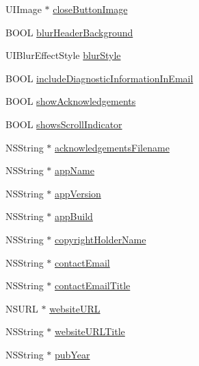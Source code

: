 \begin{DoxyCompactItemize}
\item 
U\+I\+Image $\ast$ \hyperlink{interface_r_f_about_view_controller_a4c900f72531fa3ec5ca7d2db38d3fed8}{close\+Button\+Image}
\item 
B\+O\+O\+L \hyperlink{interface_r_f_about_view_controller_a00f6a4a8433aa3571b40529ae8daf3bf}{blur\+Header\+Background}
\item 
U\+I\+Blur\+Effect\+Style \hyperlink{interface_r_f_about_view_controller_a6dc25664d6ce6038b0d3b3e89641f945}{blur\+Style}
\item 
B\+O\+O\+L \hyperlink{interface_r_f_about_view_controller_a8d3b2217c6804e41c54bb1592069c3b2}{include\+Diagnostic\+Information\+In\+Email}
\item 
B\+O\+O\+L \hyperlink{interface_r_f_about_view_controller_aec7d35dbeb254a3cc1775e9d18809fb7}{show\+Acknowledgements}
\item 
B\+O\+O\+L \hyperlink{interface_r_f_about_view_controller_a84a5073683af56bf6023d46b63f45ef5}{shows\+Scroll\+Indicator}
\item 
N\+S\+String $\ast$ \hyperlink{interface_r_f_about_view_controller_a2813930accc06d10587c6a46f17e9682}{acknowledgements\+Filename}
\item 
N\+S\+String $\ast$ \hyperlink{interface_r_f_about_view_controller_abe9bbad453dbb7512cbb31f70e8306f4}{app\+Name}
\item 
N\+S\+String $\ast$ \hyperlink{interface_r_f_about_view_controller_ab2f19b0299165e723a02dd2d0bb1b987}{app\+Version}
\item 
N\+S\+String $\ast$ \hyperlink{interface_r_f_about_view_controller_ab5c2e854a7b49b2a69eb7fa4ad83c687}{app\+Build}
\item 
N\+S\+String $\ast$ \hyperlink{interface_r_f_about_view_controller_af0339e5ce8d105d3f50a48fb590a4cb4}{copyright\+Holder\+Name}
\item 
N\+S\+String $\ast$ \hyperlink{interface_r_f_about_view_controller_aed44f1f83aaf939e3c3100bc6551a97b}{contact\+Email}
\item 
N\+S\+String $\ast$ \hyperlink{interface_r_f_about_view_controller_acf9487e02af3ead791110b40d6917a80}{contact\+Email\+Title}
\item 
N\+S\+U\+R\+L $\ast$ \hyperlink{interface_r_f_about_view_controller_ada5abbb17506142724670fc442d76d23}{website\+U\+R\+L}
\item 
N\+S\+String $\ast$ \hyperlink{interface_r_f_about_view_controller_a09a97ea3299148bec27c9c2b550b8939}{website\+U\+R\+L\+Title}
\item 
N\+S\+String $\ast$ \hyperlink{interface_r_f_about_view_controller_ad6206e0aefd08e224ea61f8f9a85a93a}{pub\+Year}
\end{DoxyCompactItemize}


